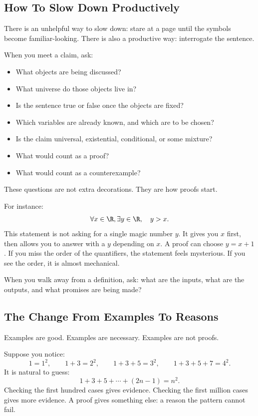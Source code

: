 \subsection{How To Slow Down Productively}

There is an unhelpful way to slow down: stare at a page until the symbols become familiar-looking. There is also a productive way: interrogate the sentence.

When you meet a claim, ask:

\begin{itemize}
\item What objects are being discussed?
\item What universe do those objects live in?
\item Is the sentence true or false once the objects are fixed?
\item Which variables are already known, and which are to be chosen?
\item Is the claim universal, existential, conditional, or some mixture?
\item What would count as a proof?
\item What would count as a counterexample?
\end{itemize}

These questions are not extra decorations. They are how proofs start.

For instance:
\[
\forall x\in\R,\exists y\in\R,\quad y>x.
\]
This statement is not asking for a single magic number $y$. It gives you $x$ first, then allows you to answer with a $y$ depending on $x$. A proof can choose $y=x+1$. If you miss the order of the quantifiers, the statement feels mysterious. If you see the order, it is almost mechanical.

\begin{walkbox}
When you walk away from a definition, ask: what are the inputs, what are the outputs, and what promises are being made?
\end{walkbox}

\subsection{The Change From Examples To Reasons}

Examples are good. Examples are necessary. Examples are not proofs.

Suppose you notice:
\[
1=1^2,\qquad 1+3=2^2,\qquad 1+3+5=3^2,\qquad 1+3+5+7=4^2.
\]
It is natural to guess:
\[
1+3+5+\cdots+(2n-1)=n^2.
\]
Checking the first hundred cases gives evidence. Checking the first million cases gives more evidence. A proof gives something else: a reason the pattern cannot fail.

